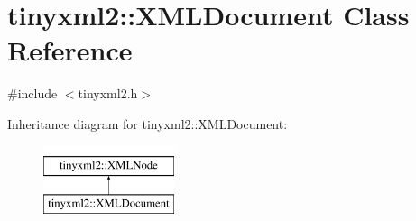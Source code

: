 \hypertarget{classtinyxml2_1_1_x_m_l_document}{}\section{tinyxml2\+:\+:X\+M\+L\+Document Class Reference}
\label{classtinyxml2_1_1_x_m_l_document}


{\ttfamily \#include $<$tinyxml2.\+h$>$}

Inheritance diagram for tinyxml2\+:\+:X\+M\+L\+Document\+:\begin{figure}[H]
\begin{center}
\leavevmode
\includegraphics[height=2.000000cm]{classtinyxml2_1_1_x_m_l_document}
\end{center}
\end{figure}
